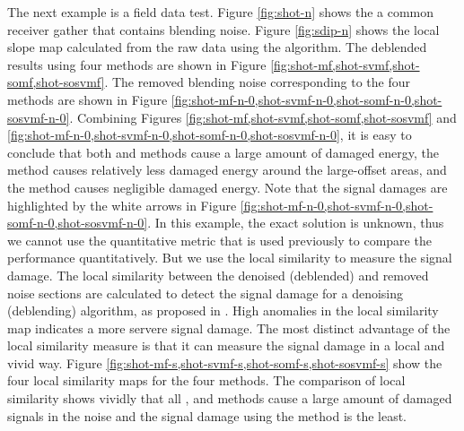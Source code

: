 The next example is a field data test. Figure \ref{fig:shot-n} shows the a common receiver gather that contains blending noise.  Figure \ref{fig:sdip-n} shows the local slope map calculated from the raw data using the  algorithm. The deblended results using four methods are shown in Figure \ref{fig:shot-mf,shot-svmf,shot-somf,shot-sosvmf}. The removed blending noise corresponding to the four methods are shown in Figure \ref{fig:shot-mf-n-0,shot-svmf-n-0,shot-somf-n-0,shot-sosvmf-n-0}. Combining Figures \ref{fig:shot-mf,shot-svmf,shot-somf,shot-sosvmf} and \ref{fig:shot-mf-n-0,shot-svmf-n-0,shot-somf-n-0,shot-sosvmf-n-0}, it is easy to conclude that both and  methods cause a large amount of damaged energy, the  method causes relatively less damaged energy around the large-offset areas, and the  method causes negligible damaged energy. Note that the signal damages are highlighted by the white arrows in Figure \ref{fig:shot-mf-n-0,shot-svmf-n-0,shot-somf-n-0,shot-sosvmf-n-0}. In this example, the exact solution is unknown, thus we cannot use the quantitative metric that is used previously to compare the performance quantitatively. But we use the local similarity to measure the signal damage. The local similarity between the denoised (deblended) and removed noise sections are calculated to detect the signal damage for a denoising (deblending) algorithm, as proposed in \cite{yangkang2015ortho}. High anomalies in the local similarity map indicates a more servere signal damage. The most distinct advantage of the local similarity measure is that it can measure the signal damage in a local and vivid way. Figure \ref{fig:shot-mf-s,shot-svmf-s,shot-somf-s,shot-sosvmf-s} show the four local similarity maps for the four methods. The comparison of local similarity shows vividly that all  , and  methods cause a large amount of damaged signals in the noise and the signal damage using the  method is the least. 

